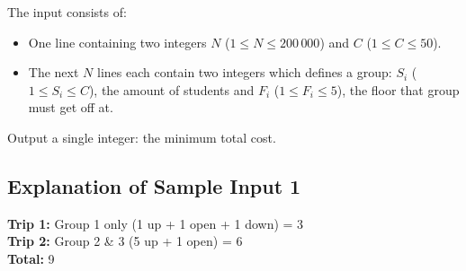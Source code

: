\begin{Input}
    The input consists of:
    \begin{itemize}
        \item One line containing two integers $N$ ($1 \leq N \leq 200\,000$) and
        $C$ ($1 \leq C \leq 50$).
        \item The next $N$ lines each contain two integers which defines a group: $S_i$ ($1 \leq S_i \leq C$), the amount of students and $F_i$ ($1 \leq F_i \leq 5$), the floor that group must get off at.
    \end{itemize}
\end{Input}

\begin{Output}
    Output a single integer: the minimum total cost.
\end{Output}

\subsection*{Explanation of Sample Input 1}
\textbf{Trip 1:} Group 1 only (1 up + 1 open + 1 down) = 3 \\
\textbf{Trip 2:} Group 2 \& 3 (5 up + 1 open) = 6 \\
\textbf{Total:} 9
